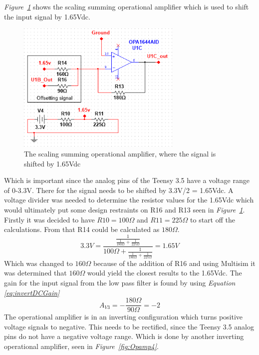 \textit{Figure~\ref{fig:Opamp3}} shows the scaling summing operational amplifier which is used to shift the input signal by 1.65Vdc. 


\begin{figure}[h]
    \centering
    \includegraphics[width=0.70\textwidth]{graphics/OPamp3.png}
    \caption{The scaling summing operational amplifier, where the signal is shifted by 1.65Vdc}
    \label{fig:Opamp3}
\end{figure}


Which is important since the analog pins of the Teensy 3.5 have a voltage range of 0-3.3V.
There for the signal needs to be shifted by 3.3V/2 = 1.65Vdc.
A voltage divider was needed to determine the resistor values for the 1.65Vdc which would ultimately put some design restraints on R16 and R13 seen in \textit{Figure~\ref{fig:Opamp3}}.
Firstly it was decided to have $R10 = 100\Omega$  and $R11 = 225\Omega$ to start off the calculations.
From that R14 could be calculated as $180\Omega$.
$$3.3V = \frac{\frac{1}{\frac{1}{180\Omega}+\frac{1}{225\Omega}}}{100\Omega+\frac{1}{\frac{1}{180\Omega}+\frac{1}{225\Omega}}} = 1.65V$$
Which was changed to $160\Omega$ because of the addition of R16 and using Multisim it was determined that $160\Omega$ would yield the closest results to the 1.65Vdc.
The gain for the input signal from the low pass filter is found by using \textit{Equation \ref{eq:invertDCGain}}
$$A_{V3} = -\frac{180\Omega}{90\Omega} = -2$$
The operational amplifier is in an inverting configuration which turns positive voltage signals to negative.
This needs to be rectified, since the Teensy 3.5 analog pins do not have a negative voltage range.
Which is done by another inverting operational amplifier, seen in \textit{Figure~\ref{fig:Opamp4}}.

